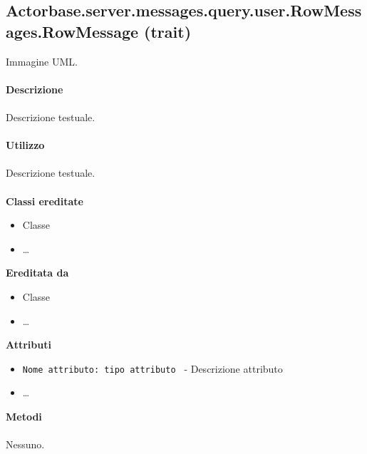 \documentclass[a4paper]{article}
\begin{document}
	\subsection{Actorbase.server.messages.query.user.RowMessages.RowMessage (trait)}
		Immagine UML.
		\\ \\
		\textbf{Descrizione}
			\\ \\
			Descrizione testuale.
			\\ \\
		\textbf{Utilizzo}
			\\ \\
			Descrizione testuale.
			\\ \\
		\textbf{Classi ereditate}
			\begin{itemize}
				\item Classe
				\item \dots
			\end{itemize}
		\textbf{Ereditata da}
			\begin{itemize}
				\item Classe
				\item \dots
			\end{itemize}
		\textbf{Attributi}
			\begin{itemize}
				\item \texttt{Nome attributo: tipo attributo } - Descrizione attributo
				\item \dots
			\end{itemize}
		\textbf{Metodi}
			\\ \\
			Nessuno.	
			
\end{document}

